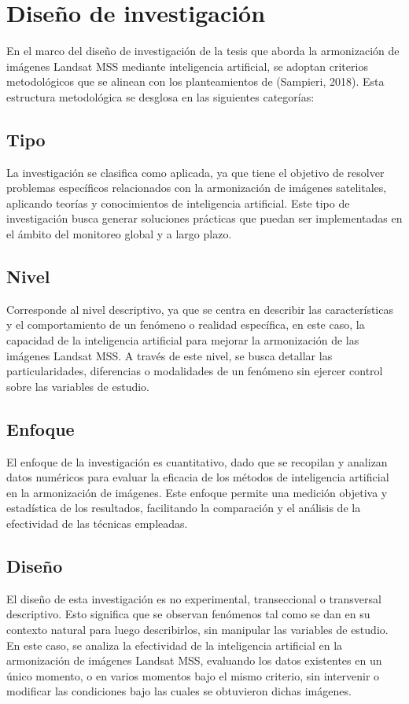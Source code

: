     \section{Diseño de investigación}
        En el marco del diseño de investigación de la tesis que aborda la armonización de imágenes Landsat MSS mediante inteligencia artificial, se adoptan criterios metodológicos que se alinean con los planteamientos de (Sampieri, 2018). Esta estructura metodológica se desglosa en las siguientes categorías:
        \subsection{Tipo}
            La investigación se clasifica como aplicada, ya que tiene el objetivo de resolver problemas específicos relacionados con la armonización de imágenes satelitales, aplicando teorías y conocimientos de inteligencia artificial. Este tipo de investigación busca generar soluciones prácticas que puedan ser implementadas en el ámbito del monitoreo global y a largo plazo.

        \subsection{Nivel}
            Corresponde al nivel descriptivo, ya que se centra en describir las características y el comportamiento de un fenómeno o realidad específica, en este caso, la capacidad de la inteligencia artificial para mejorar la armonización de las imágenes Landsat MSS. A través de este nivel, se busca detallar las particularidades, diferencias o modalidades de un fenómeno sin ejercer control sobre las variables de estudio.

        \subsection{Enfoque}
            El enfoque de la investigación es cuantitativo, dado que se recopilan y analizan datos numéricos para evaluar la eficacia de los métodos de inteligencia artificial en la armonización de imágenes. Este enfoque permite una medición objetiva y estadística de los resultados, facilitando la comparación y el análisis de la efectividad de las técnicas empleadas.  

	    \subsection{Diseño}
            El diseño de esta investigación es no experimental, transeccional o transversal descriptivo. Esto significa que se observan fenómenos tal como se dan en su contexto natural para luego describirlos, sin manipular las variables de estudio. En este caso, se analiza la efectividad de la inteligencia artificial en la armonización de imágenes Landsat MSS, evaluando los datos existentes en un único momento, o en varios momentos bajo el mismo criterio, sin intervenir o modificar las condiciones bajo las cuales se obtuvieron dichas imágenes.

